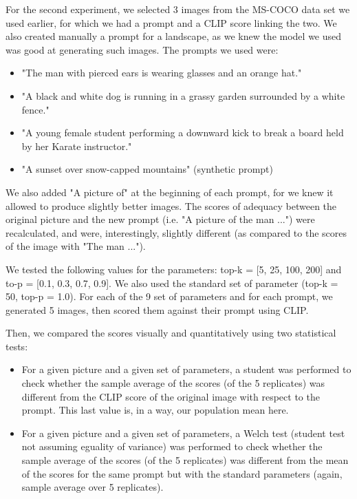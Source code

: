 \documentclass{article}
\begin{document}
For the second experiment, we selected 3 images from the MS-COCO data set we used earlier, for which we had a prompt and a CLIP score linking the two. We also created manually a prompt for a landscape, as we knew the model we used was good at generating such images. The prompts we used were:
\begin{itemize}
    \item "The man with pierced ears is wearing glasses and an orange hat."
    \item "A black and white dog is running in a grassy garden surrounded by a white fence."
    \item "A young female student performing a downward kick to break a board held by her Karate instructor."
    \item "A sunset over snow-capped mountains" (synthetic prompt)
\end{itemize}
We also added "A picture of" at the beginning of each prompt, for we knew it allowed to produce slightly better images. The scores of adequacy between the original picture and the new prompt (i.e. "A picture of the man ...") were recalculated, and were, interestingly, slightly different (as compared to the scores of the image with "The man ..."). 

We tested the following values for the parameters: top-k = [5, 25, 100, 200] and to-p = [0.1, 0.3, 0.7, 0.9]. We also used the standard set of parameter (top-k = 50, top-p = 1.0). For each of the 9 set of parameters and for each prompt, we generated 5 images, then scored them against their prompt using CLIP.

Then, we compared the scores visually and quantitatively using two statistical tests:
\begin{itemize}
    \item For a given picture and a given set of parameters, a student was performed to check whether the sample average of the scores (of the 5 replicates) was different from the CLIP score of the original image with respect to the prompt. This last value is, in a way, our population mean here. 
    \item For a given picture and a given set of parameters, a Welch test (student test not assuming eguality of variance) was performed to check whether the sample average of the scores (of the 5 replicates) was different from the mean of the scores for the same prompt but with the standard parameters (again, sample average over 5 replicates). 
\end{itemize}
\end{document}
